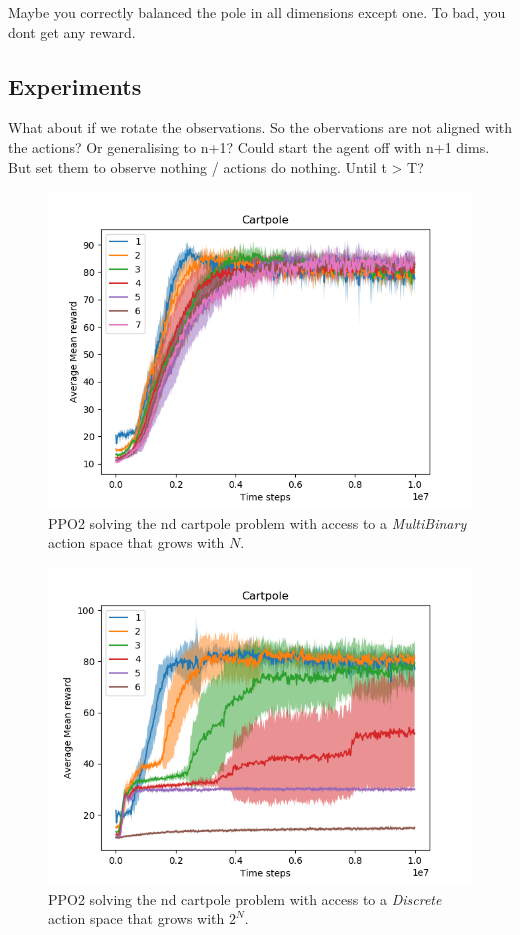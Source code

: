 Maybe you correctly balanced the pole in all dimensions except one. To bad, you dont get any reward.



\subsection{Experiments}

What about if we rotate the observations. So the obervations are not aligned with the actions?
Or generalising to n+1? Could start the agent off with n+1 dims. But set them to observe nothing / actions do nothing. Until t > T?

\begin{figure}
  \centering
  \includegraphics[width=1\textwidth,height=0.5\textheight]{../../pictures/figures/multibinary-nd-cart.png}
  \caption{PPO2 solving the nd cartpole problem with access to a \textit{MultiBinary} action space that grows with $N$.}
\end{figure}

\begin{figure}
\centering
\includegraphics[width=1\textwidth,height=0.5\textheight]{../../pictures/figures/discrete-nd-cart.png}
\caption{PPO2 solving the nd cartpole problem with access to a \textit{Discrete} action space that grows with $2^N$.}
\end{figure}


